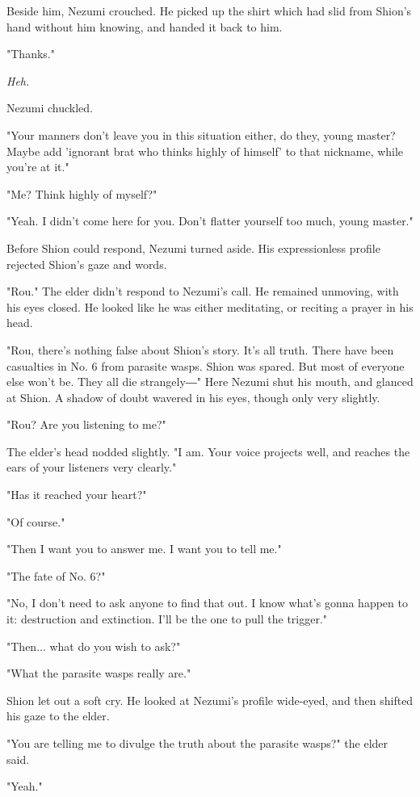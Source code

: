 Beside him, Nezumi crouched. He picked up the shirt which had slid from
Shion's hand without him knowing, and handed it back to him.

"Thanks."

\emph{Heh.}

Nezumi chuckled.

"Your manners don't leave you in this situation either, do they, young
master? Maybe add 'ignorant brat who thinks highly of himself' to that
nickname, while you're at it."

"Me? Think highly of myself?"

"Yeah. I didn't come here for you. Don't flatter yourself too much,
young master."

Before Shion could respond, Nezumi turned aside. His expressionless
profile rejected Shion's gaze and words.

"Rou." The elder didn't respond to Nezumi's call. He remained unmoving,
with his eyes closed. He looked like he was either meditating, or
reciting a prayer in his head.

"Rou, there's nothing false about Shion's story. It's all truth. There
have been casualties in No. 6 from parasite wasps. Shion was spared. But
most of everyone else won't be. They all die strangely―" Here Nezumi
shut his mouth, and glanced at Shion. A shadow of doubt wavered in his
eyes, though only very slightly.

"Rou? Are you listening to me?"

The elder's head nodded slightly. "I am. Your voice projects well, and
reaches the ears of your listeners very clearly."

"Has it reached your heart?"

"Of course."

"Then I want you to answer me. I want you to tell me."

"The fate of No. 6?"

"No, I don't need to ask anyone to find that out. I know what's gonna
happen to it: destruction and extinction. I'll be the one to pull the
trigger."

"Then... what do you wish to ask?"

"What the parasite wasps really are."

Shion let out a soft cry. He looked at Nezumi's profile wide-eyed, and
then shifted his gaze to the elder.

"You are telling me to divulge the truth about the parasite wasps?" the
elder said.

"Yeah."

